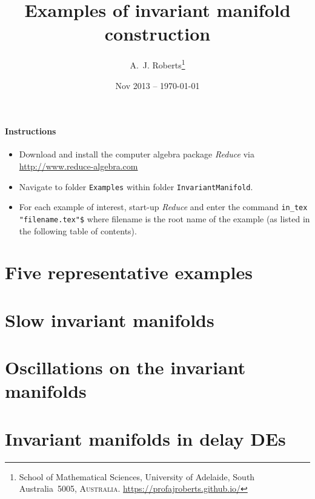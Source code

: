 \documentclass[11pt,a4paper]{refart}
\title{Examples of invariant manifold construction}
\author{A.~J. Roberts\thanks{School of Mathematical Sciences, University of Adelaide, South Australia~5005, \textsc{Australia}.
\url{https://profajroberts.github.io/}}}
\date{Nov 2013 -- \today}
\begin{document}
\maketitle


\paragraph{Instructions}
\begin{itemize}
\item Download and install the computer algebra package
\emph{Reduce} via \url{http://www.reduce-algebra.com}

\item Navigate to folder \verb|Examples| within folder \verb|InvariantManifold|.

\item For each example of interest, start-up \emph{Reduce} and enter the command \verb|in_tex "filename.tex"$|  where filename is the root name of the example (as listed in the following table of contents).

\end{itemize}


\tableofcontents




\section{Five representative examples}












\section{Slow invariant manifolds}






\section{Oscillations on the invariant manifolds}







\section{Invariant manifolds in delay DEs}







\end{document}
